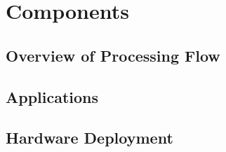 
\section{Components}

\subsection{Overview of Processing Flow}

\subsection{Applications}

\subsection{Hardware Deployment}


